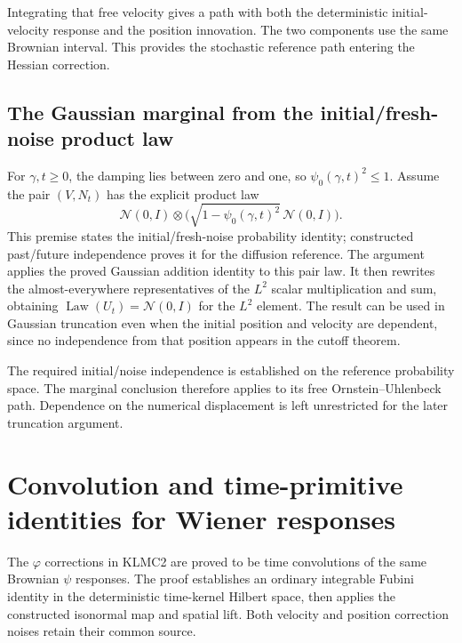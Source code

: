 \documentclass[11pt,a4paper]{report}
\begin{document}
Integrating that free velocity gives a path with both the deterministic initial-velocity response and the position innovation. The two components use the same Brownian interval. This provides the stochastic reference path entering the Hessian correction.

\subsection{\texorpdfstring{The Gaussian marginal from the initial/\allowbreak{}fresh-noise product law}{The Gaussian marginal from the initial/fresh-noise product law}}
\label{report-step-KineticLangevin-FreeOU-lean-3}


For \(\gamma,t\ge0\), the damping lies between zero and one, so \(\psi_0(\gamma,t)^2\le1\). Assume the pair \((V,N_t)\) has the explicit product law \[\mathcal N(0,I)\otimes\bigl(\sqrt{1-\psi_0(\gamma,t)^2}\,\mathcal N(0,I)\bigr).\] This premise states the initial/\allowbreak{}fresh-noise probability identity; constructed past/\allowbreak{}future independence proves it for the diffusion reference. The argument applies the proved Gaussian addition identity to this pair law. It then rewrites the almost-everywhere representatives of the \(L^{2}\) scalar multiplication and sum, obtaining \(\operatorname{Law}(U_t)=\mathcal N(0,I)\) for the \(L^{2}\) element. The result can be used in Gaussian truncation even when the initial position and velocity are dependent, since no independence from that position appears in the cutoff theorem.



The required initial/\allowbreak{}noise independence is established on the reference probability space. The marginal conclusion therefore applies to its free Ornstein–Uhlenbeck path. Dependence on the numerical displacement is left unrestricted for the later truncation argument.

\section{\texorpdfstring{Convolution and time-primitive identities for Wiener responses}{Convolution and time-primitive identities for Wiener responses}}
\label{proof-module-KineticLangevin-KernelConvolution-lean}


The \(\varphi\) corrections in KLMC2 are proved to be time convolutions of the same Brownian \(\psi\) responses. The proof establishes an ordinary integrable Fubini identity in the deterministic time-kernel Hilbert space, then applies the constructed isonormal map and spatial lift. Both velocity and position correction noises retain their common source.
\end{document}
